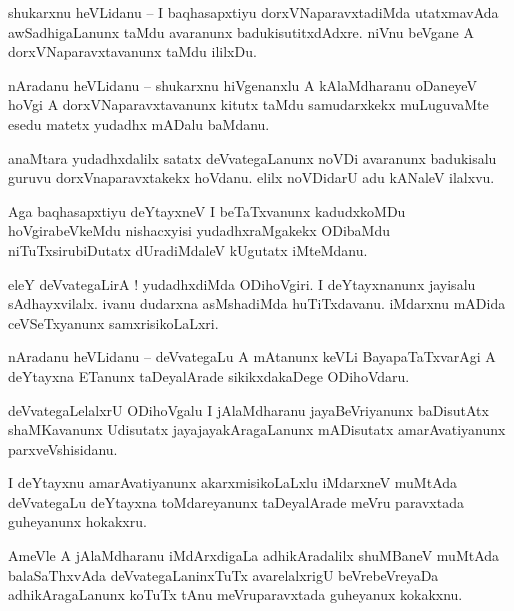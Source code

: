 \documentclass{article}
\begin{document}
\begin{mn}%
shukarxnu heVLidanu -- I baqhasapxtiyu dorxVNaparavxtadiMda utatxmavAda awSadhigaLanunx taMdu 
avaranunx badukisutitxdAdxre. niVnu beVgane A dorxVNaparavxtavanunx taMdu ililxDu.
\end{mn}

\begin{mn}%
nAradanu heVLidanu -- shukarxnu hiVgenanxlu A kAlaMdharanu oDaneyeV hoVgi A dorxVNaparavxtavanunx 
kitutx taMdu samudarxkekx muLuguvaMte esedu matetx yudadhx mADalu baMdanu.
\end{mn}

\begin{mn}%
anaMtara yudadhxdalilx satatx deVvategaLanunx noVDi avaranunx badukisalu guruvu dorxVnaparavxtakekx 
hoVdanu. elilx noVDidarU adu kANaleV ilalxvu.
\end{mn}

\begin{mn}%
Aga baqhasapxtiyu deYtayxneV I beTaTxvanunx kadudxkoMDu hoVgirabeVkeMdu nishacxyisi 
yudadhxraMgakekx ODibaMdu niTuTxsirubiDutatx dUradiMdaleV kUgutatx iMteMdanu.
\end{mn}

\begin{mn}%
eleY deVvategaLirA ! yudadhxdiMda ODihoVgiri. I deYtayxnanunx jayisalu sAdhayxvilalx. ivanu 
dudarxna asMshadiMda huTiTxdavanu. iMdarxnu mADida ceVSeTxyanunx samxrisikoLaLxri.
\end{mn}

\begin{mn}%
nAradanu heVLidanu -- deVvategaLu A mAtanunx keVLi BayapaTaTxvarAgi A deYtayxna ETanunx 
taDeyalArade sikikxdakaDege ODihoVdaru.
\end{mn}

\begin{mn}%
deVvategaLelalxrU ODihoVgalu I jAlaMdharanu jayaBeVriyanunx baDisutAtx shaMKavanunx Udisutatx 
jayajayakAragaLanunx mADisutatx amarAvatiyanunx parxveVshisidanu.
\end{mn}

\begin{mn}%
I deYtayxnu amarAvatiyanunx akarxmisikoLaLxlu iMdarxneV muMtAda deVvategaLu deYtayxna toMdareyanunx 
taDeyalArade meVru paravxtada guheyanunx hokakxru.
\end{mn}

\begin{mn}%
AmeVle A jAlaMdharanu iMdArxdigaLa adhikAradalilx shuMBaneV muMtAda balaSaThxvAda 
deVvategaLaninxTuTx avarelalxrigU beVrebeVreyaDa adhikAragaLanunx koTuTx tAnu meVruparavxtada 
guheyanux kokakxnu.
\end{mn}
\end{document}

